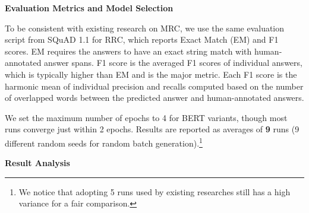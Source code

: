 \textbf{Evaluation Metrics and Model Selection}

To be consistent with existing research on MRC,
we use the same evaluation script from SQuAD 1.1 \cite{rajpurkar2016squad} for RRC, which reports Exact Match (EM) and F1 scores.
EM requires the answers to have an exact string match with human-annotated answer spans.
F1 score is the averaged F1 scores of individual answers, which is typically higher than EM and is the major metric.
Each F1 score is the harmonic mean of individual precision and recalls computed based on the number of overlapped words between the predicted answer and human-annotated answers.

We set the maximum number of epochs to 4 for BERT variants, though most runs converge just within 2 epochs.
Results are reported as averages of \textbf{9} runs (9 different random seeds for random batch generation).\footnote{We notice that adopting 5 runs used by existing researches still has a high variance for a fair comparison.} 

\textbf{Result Analysis}

\begin{table}[H]
    \centering
    \caption{RRC in EM (Exact Match) and F1.}
\label{chap6:tbl:result_rc}
\vspace{-3mm}
\end{table}


